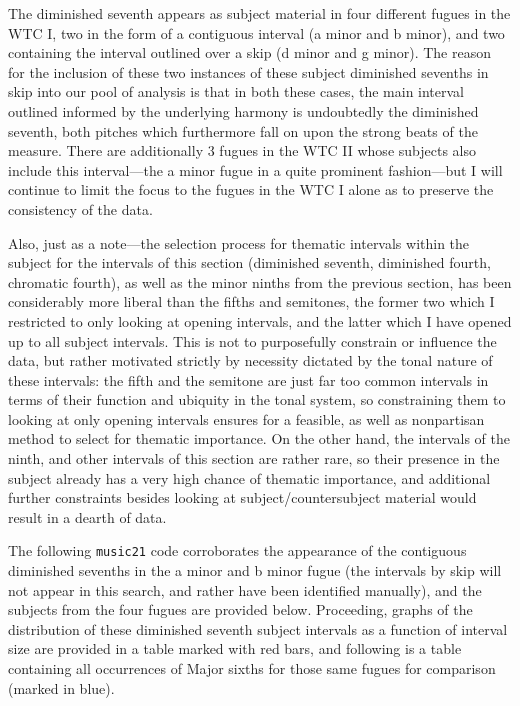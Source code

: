 The diminished seventh appears as subject material in four different
fugues in the WTC I, two in the form of a contiguous interval (a minor
and b minor), and two containing the interval outlined over a skip (d
minor and g minor). The reason for the inclusion of these two instances
of these subject diminished sevenths in skip into our pool of analysis
is that in both these cases, the main interval outlined informed by the
underlying harmony is undoubtedly the diminished seventh, both pitches
which furthermore fall on upon the strong beats of the measure. There
are additionally 3 fugues in the WTC II whose subjects also include this
interval---the a minor fugue in a quite prominent fashion---but
I will continue to limit the focus to the fugues in the WTC I alone as
to preserve the consistency of the data.

Also, just as a note---the selection process for thematic intervals
within the subject for the intervals of this section (diminished
seventh, diminished fourth, chromatic fourth), as well as the minor
ninths from the previous section, has been considerably more liberal
than the fifths and semitones, the former two which I restricted to only
looking at opening intervals, and the latter which I have opened up to
all subject intervals. This is not to purposefully constrain or
influence the data, but rather motivated strictly by necessity dictated
by the tonal nature of these intervals: the fifth and the semitone are
just far too common intervals in terms of their function and ubiquity in
the tonal system, so constraining them to looking at only opening
intervals ensures for a feasible, as well as nonpartisan method to
select for thematic importance. On the other hand, the intervals of the
ninth, and other intervals of this section are rather rare, so their
presence in the subject already has a very high chance of thematic
importance, and additional further constraints besides looking at
subject/countersubject material would result in a dearth of data.

The following \texttt{music21} code corroborates the appearance of the
contiguous diminished sevenths in the a minor and b minor fugue (the
intervals by skip will not appear in this search, and rather have been
identified manually), and the subjects from the four fugues are provided
below. Proceeding, graphs of the distribution of these diminished
seventh subject intervals as a function of interval size are provided in
a table marked with red bars, and following is a table containing all
occurrences of Major sixths for those same fugues for comparison (marked
in blue).

